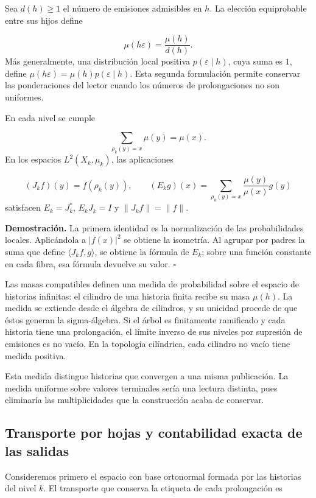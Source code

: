 Sea \(d(h)\geq1\) el número de emisiones admisibles en \(h\). La elección equiprobable entre sus hijos define

\[
\mu(h\varepsilon)=\frac{\mu(h)}{d(h)}.
\]
Más generalmente, una distribución local positiva \(p(\varepsilon\mid h)\), cuya suma es \(1\), define \(\mu(h\varepsilon)=\mu(h)p(\varepsilon\mid h)\). Esta segunda formulación permite conservar las ponderaciones del lector cuando los números de prolongaciones no son uniformes.

En cada nivel se cumple

\[
\sum_{\rho_k(y)=x}\mu(y)=\mu(x).
\]
En los espacios \(L^2(X_k,\mu_k)\), las aplicaciones

\[
(J_kf)(y)=f(\rho_k(y)),
\qquad
(E_kg)(x)=\sum_{\rho_k(y)=x}\frac{\mu(y)}{\mu(x)}g(y)
\]
satisfacen \(E_k=J_k^*\), \(E_kJ_k=I\) y \(\|J_kf\|=\|f\|\).

\textbf{Demostración.} La primera identidad es la normalización de las probabilidades locales. Aplicándola a \(|f(x)|^2\) se obtiene la isometría. Al agrupar por padres la suma que define \(\langle J_kf,g\rangle\), se obtiene la fórmula de \(E_k\); sobre una función constante en cada fibra, esa fórmula devuelve su valor. \hfill\(\square\)

Las masas compatibles definen una medida de probabilidad sobre el espacio de historias infinitas: el cilindro de una historia finita recibe su masa \(\mu(h)\). La medida se extiende desde el álgebra de cilindros, y su unicidad procede de que éstos generan la sigma-álgebra. Si el árbol es finitamente ramificado y cada historia tiene una prolongación, el límite inverso de sus niveles por supresión de emisiones es no vacío. En la topología cilíndrica, cada cilindro no vacío tiene medida positiva.

Esta medida distingue historias que convergen a una misma publicación. La medida uniforme sobre valores terminales sería una lectura distinta, pues eliminaría las multiplicidades que la construcción acaba de conservar.

\subsection{Transporte por hojas y contabilidad exacta de las salidas}
Consideremos primero el espacio con base ortonormal formada por las historias del nivel \(k\). El transporte que conserva la etiqueta de cada prolongación es

